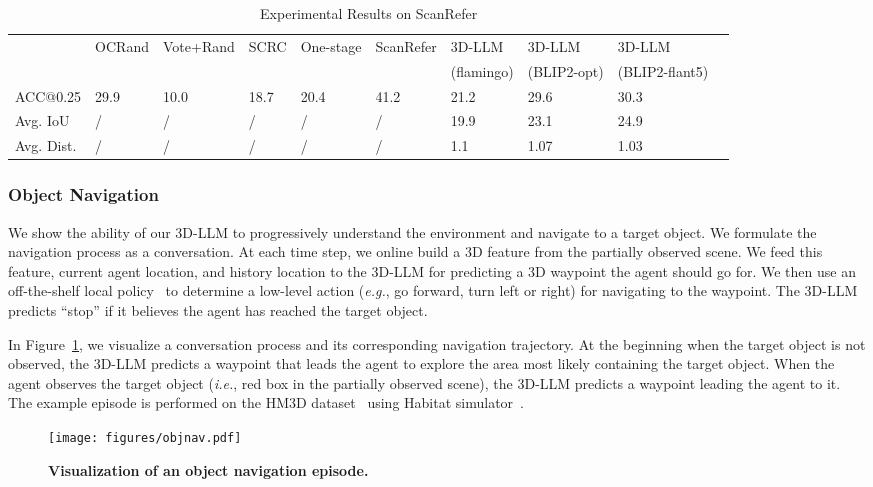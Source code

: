 \begin{table}[!ht]
    \setlength{\tabcolsep}{0.17em}
    \centering
    \small
    \begin{tabular}{l|lllllllll}
        \hline
        ~ & OCRand & Vote+Rand & SCRC & One-stage & ScanRefer & 3D-LLM  & 3D-LLM & 3D-LLM  \\ 
        ~ &  &  &  &  &  & (flamingo) & (BLIP2-opt) & (BLIP2-flant5) \\ \hline
        ACC@0.25 & 29.9 & 10.0 & 18.7 & 20.4  & 41.2 & 21.2 & 29.6 & 30.3 \\ 
        Avg. IoU & / & / & / & / & / & 19.9 & 23.1 & 24.9 \\ 
        Avg. Dist. & / & / &/ & /  & / & 1.1 & 1.07 & 1.03 \\ 
        \hline
    \end{tabular}
    \caption{Experimental Results on ScanRefer}
    \label{tab:grounding}
\end{table}

\subsubsection{Object Navigation}
We show the ability of our 3D-LLM to progressively understand the environment and navigate to a target object. We formulate the navigation process as a conversation. At each time step, we online build a 3D feature from the partially observed scene. We feed this feature, current agent location, and history location to the 3D-LLM for predicting a 3D waypoint the agent should go for. We then use an off-the-shelf local policy~\cite{wijmans2019dd} to determine a low-level action (\textit{e.g.}, go forward, turn left or right) for navigating to the waypoint. The 3D-LLM predicts ``stop'' if it believes the agent has reached the target object. 

In Figure~\ref{fig:objnav}, we visualize a conversation process and its corresponding navigation trajectory. At the beginning when the target object is not observed, the 3D-LLM predicts a waypoint that leads the agent to explore the area most likely containing the target object. When the agent observes the target object (\textit{i.e.}, red box in the partially observed scene), the 3D-LLM predicts a waypoint leading the agent to it. The example episode is performed on the HM3D dataset~\cite{ramakrishnan2021habitat} using Habitat simulator~\cite{savva2019habitat}.



\begin{figure}[t]
    \centering
    \texttt{[image: figures/objnav.pdf]}
\caption{\textbf{Visualization of an object navigation episode.}}
    \label{fig:objnav}
\end{figure}




